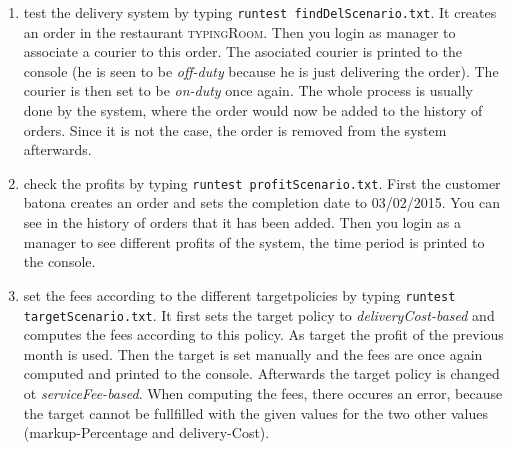 \begin{enumerate}[itemsep=0mm]
	\item test the delivery system by typing \lstinline|runtest findDelScenario.txt|. It creates
		an order in the restaurant \textsc{typingRoom}. Then you login as manager to 
		associate a courier to this order. The asociated courier is printed to the console 
		(he is seen to be \textit{off-duty} because he is just delivering the order). 
		The courier is then set to be \textit{on-duty} once again. The whole process is 
		usually done by the system, where the order would now be added to the history of 
		orders. Since it is not the case, the order is removed from the system afterwards.
	\item check the profits by typing \lstinline|runtest profitScenario.txt|. First the customer
		batona creates an order and sets the completion date to \textsc{03/02/2015}. You can 
		see in the history of orders that it has been added. Then you login as a manager to 
		see different profits of the system, the time period is printed to the console.
	\item set the fees according to the different targetpolicies by typing 
		\lstinline|runtest targetScenario.txt|. It first sets the target policy to
		\textit{deliveryCost-based} and computes the fees according to this policy. As 
		target the profit of the previous month is used. Then the target is set manually and
		the fees are once again computed and printed to the console. Afterwards the 
		target policy is changed ot \textit{serviceFee-based}. When computing the fees, there
		occures an error, because the target cannot be fullfilled with the given values for 
		the two other values (markup-Percentage and delivery-Cost).
		
	
		
\end{enumerate}

